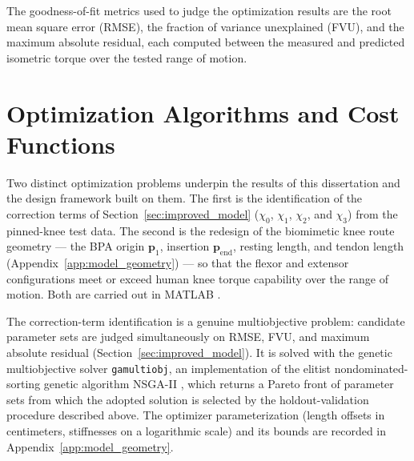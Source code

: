 The goodness-of-fit metrics used to judge the optimization results are the root mean square error (RMSE), the fraction of variance unexplained (FVU), and the maximum absolute residual, each computed between the measured and predicted isometric torque over the tested range of motion.

\section{Optimization Algorithms and Cost Functions}\label{sec:optimization}

Two distinct optimization problems underpin the results of this dissertation and the design framework built on them. The first is the identification of the correction terms of Section~\ref{sec:improved_model} ($\chi_{0}$, $\chi_{1}$, $\chi_{2}$, and $\chi_{3}$) from the pinned-knee test data. The second is the redesign of the biomimetic knee route geometry --- the BPA origin $\mathbf{p}_{1}$, insertion $\mathbf{p}_{\text{end}}$, resting length, and tendon length (Appendix~\ref{app:model_geometry}) --- so that the flexor and extensor configurations meet or exceed human knee torque capability over the range of motion. Both are carried out in MATLAB \citep{mathworks_optimization_2025}.

The correction-term identification is a genuine multiobjective problem: candidate parameter sets are judged simultaneously on RMSE, FVU, and maximum absolute residual (Section~\ref{sec:improved_model}). It is solved with the genetic multiobjective solver \texttt{gamultiobj}, an implementation of the elitist nondominated-sorting genetic algorithm NSGA-II \citep{deb_nsga2_2002, mathworks_optimization_2025}, which returns a Pareto front of parameter sets from which the adopted solution is selected by the holdout-validation procedure described above. The optimizer parameterization (length offsets in centimeters, stiffnesses on a logarithmic scale) and its bounds are recorded in Appendix~\ref{app:model_geometry}.

